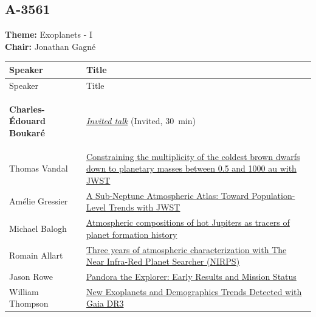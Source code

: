 \hypertarget{schedule-wednesday-morning-a-3561}{}
\subsection*{A-3561}
\textbf{Theme:} Exoplanets - I\\
\textbf{Chair:} Jonathan Gagné\\
{\small
{}
\sloppy
\setlength{\emergencystretch}{1em}
\begin{longtable}{@{}>{\TableRaggedRight\arraybackslash\hspace{0pt}}p{} >{\TableRaggedRight\arraybackslash\hspace{0pt}}p{}@{}}
\toprule
Speaker & Title \\
\midrule
\endfirsthead
\toprule
Speaker & Title \\
\midrule
\endhead
\hypertarget{invited-charles-edouard-boukare-sched}{}\label{invited-page-charles-edouard-boukare-sched}{\bfseries\color{cascagold}Charles-Édouard Boukaré} & \hyperlink{invited-charles-edouard-boukare}{\emph{Invited talk}} {\small\color{cascagold}(Invited, 30~min)} \\
\hypertarget{schedule-talk-233}{}\label{schedule-page-talk-233}Thomas Vandal & \hyperlink{abstract-talk-233}{Constraining the multiplicity of the coldest brown dwarfs down to planetary masses between 0.5 and 1000 au with JWST} \\
\hypertarget{schedule-talk-224}{}\label{schedule-page-talk-224}Amélie Gressier & \hyperlink{abstract-talk-224}{A Sub-Neptune Atmospheric Atlas: Toward Population-Level Trends with JWST} \\
\hypertarget{schedule-talk-82}{}\label{schedule-page-talk-82}Michael Balogh & \hyperlink{abstract-talk-82}{Atmospheric compositions of hot Jupiters as tracers of planet formation history} \\
\hypertarget{schedule-talk-234}{}\label{schedule-page-talk-234}Romain Allart & \hyperlink{abstract-talk-234}{Three years of atmospheric characterization with The Near Infra-Red Planet Searcher (NIRPS)} \\
\hypertarget{schedule-talk-228}{}\label{schedule-page-talk-228}Jason Rowe & \hyperlink{abstract-talk-228}{Pandora the Explorer: Early Results and Mission Status} \\
\hypertarget{schedule-talk-284}{}\label{schedule-page-talk-284}William Thompson & \hyperlink{abstract-talk-284}{New Exoplanets and Demographics Trends Detected with Gaia DR3} \\
\bottomrule
\end{longtable}
}

